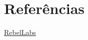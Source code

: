 \section{Referências}

\href{http://zeroturnaround.com/rebellabs/the-curious-coders-java-web-frameworks-comparison-spring-mvc-grails-vaadin-gwt-wicket-play-struts-and-jsf/}{RebelLabs}
